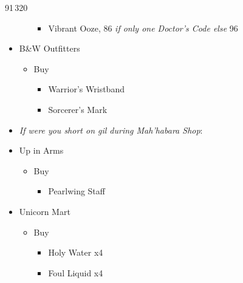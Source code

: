 \documentclass{report}
\begin{document}
\begin{shop}{91\,320}
\begin{multicols}{2}
\begin{itemize}
\begin{itemize}
\begin{itemize}
            \item Vibrant Ooze, 86 \textit{if only one Doctor's Code else} 96
        \end{itemize}
    \end{itemize}
    \item B\&W Outfitters
    \begin{itemize}
        \item Buy
        \begin{itemize}
            \item Warrior's Wristband
            \item Sorcerer's Mark
        \end{itemize}
    \end{itemize}
    \columnbreak
    \item \textit{If were you short on gil during Mah'habara Shop}:
    \item Up in Arms
    \begin{itemize}
        \item Buy
        \begin{itemize}
            \item Pearlwing Staff
        \end{itemize}
    \end{itemize}
    \item Unicorn Mart
    \begin{itemize}
        \item Buy
        \begin{itemize}
            \item Holy Water x4
            \item Foul Liquid x4
        \end{itemize}
    \end{itemize}
\end{itemize}
\end{multicols}
\end{shop}
\end{document}
